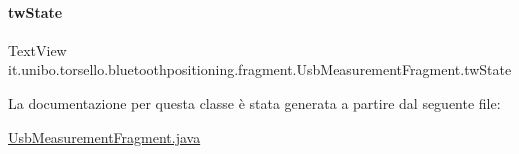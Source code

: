 \paragraph{\texorpdfstring{tw\+State}{twState}}
{\footnotesize\ttfamily Text\+View it.\+unibo.\+torsello.\+bluetoothpositioning.\+fragment.\+Usb\+Measurement\+Fragment.\+tw\+State\hspace{0.3cm}{\ttfamily [private]}}



La documentazione per questa classe è stata generata a partire dal seguente file\+:\begin{DoxyCompactItemize}
\item 
\hyperlink{UsbMeasurementFragment_8java}{Usb\+Measurement\+Fragment.\+java}\end{DoxyCompactItemize}
